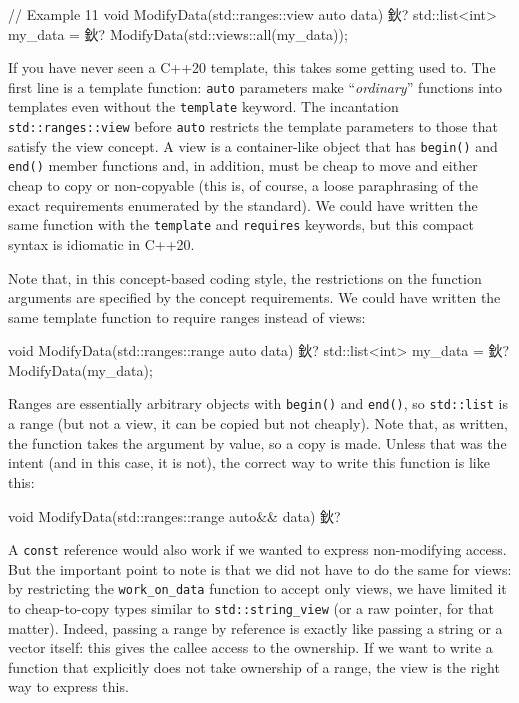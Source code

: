 \begin{code}
// Example 11
void ModifyData(std::ranges::view auto data) { 鈥?}
std::list<int> my_data = 鈥?
ModifyData(std::views::all(my_data));
\end{code}

If you have never seen a C++20 template, this takes some getting used to. The first line is a template function: \texttt{auto} parameters make ``\emph{ordinary}'' functions into templates even without the \texttt{template} keyword. The incantation \texttt{std::ranges::view} before \texttt{auto} restricts the template parameters to those that satisfy the view concept. A view is a container-like object that has \texttt{begin()} and \texttt{end()} member functions and, in addition, must be cheap to move and either cheap to copy or non-copyable (this is, of course, a loose paraphrasing of the exact requirements enumerated by the standard). We could have written the same function with the \texttt{template} and \texttt{requires} keywords, but this compact syntax is idiomatic in C++20.

Note that, in this concept-based coding style, the restrictions on the function arguments are specified by the concept requirements. We could have written the same template function to require ranges instead of views:

\begin{code}
void ModifyData(std::ranges::range auto data) { 鈥?}
std::list<int> my_data = 鈥?
ModifyData(my_data);
\end{code}

Ranges are essentially arbitrary objects with \texttt{begin()} and \texttt{end()}, so \texttt{std::list} is a range (but not a view, it can be copied but not cheaply). Note that, as written, the function takes the argument by value, so a copy is made. Unless that was the intent (and in this case, it is not), the correct way to write this function is like this:

\begin{code}
void ModifyData(std::ranges::range auto&& data) { 鈥?}
\end{code}

A \texttt{const} reference would also work if we wanted to express non-modifying access. But the important point to note is that we did not have to do the same for views: by restricting the \texttt{work\_on\_data} function to accept only views, we have limited it to cheap-to-copy types similar to \texttt{std::string\_view} (or a raw pointer, for that matter). Indeed, passing a range by reference is exactly like passing a string or a vector itself: this gives the callee access to the ownership. If we want to write a function that explicitly does not take ownership of a range, the view is the right way to express this.

